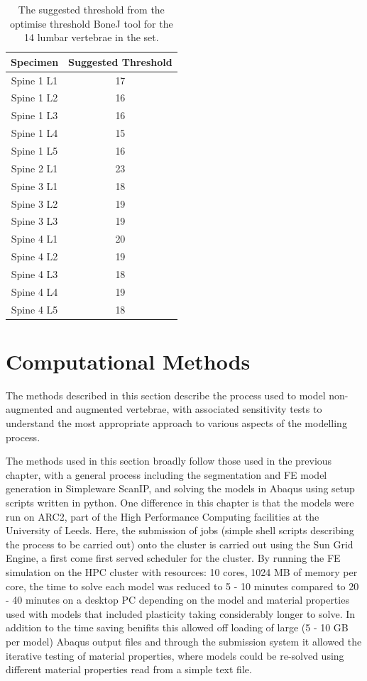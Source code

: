 \begin{table}[ht!]
	\caption{The suggested threshold from the optimise threshold BoneJ tool for
the 14 lumbar vertebrae in the set.}
	\label{tab:optTH}
	\centering
	\begin{tabular}{c|c}
    Specimen    & Suggested Threshold   \\ \hline \hline
    Spine 1 L1 & 17 \\
    Spine 1 L2 & 16\\
    Spine 1 L3 & 16\\
    Spine 1 L4 & 15\\
    Spine 1 L5 & 16\\
    Spine 2 L1 & 23\\
    Spine 3 L1 & 18\\
    Spine 3 L2 & 19\\
    Spine 3 L3 & 19\\
    Spine 4 L1 & 20\\
    Spine 4 L2 & 19\\
    Spine 4 L3 & 18\\
    Spine 4 L4 & 19\\
    Spine 4 L5 & 18\\
    \hline
	\end{tabular}
\end{table}



\section{Computational Methods}\label{sec:comp_mod}

The methods described in this section describe the process used to model
non-augmented and augmented vertebrae, with associated sensitivity tests to
understand the most appropriate approach to various aspects of the modelling
process.


The methods used in this section broadly follow those used in the previous
chapter, with a general process including the segmentation and FE model
generation in Simpleware ScanIP, and solving the models in Abaqus using setup
scripts written in python. One difference in this chapter is that the models
were run on ARC2, part of the High Performance Computing facilities at the
University of Leeds. Here, the submission of jobs (simple shell scripts
describing the process to be carried out) onto the cluster is carried out using
the Sun Grid
Engine, a first come first served scheduler for the cluster. By running the FE
simulation on the HPC cluster with resources: 10 cores, 1024 MB of memory per
core, the time to solve each model was reduced to 5 - 10 minutes compared to 20
- 40 minutes on a desktop PC depending on the model and material properties
used with models that included plasticity taking considerably longer to solve.
In addition to the time saving benifits this allowed off loading of large (5 -
10 GB per model) Abaqus output files and through the submission system it
allowed the iterative testing of material properties, where models could be
re-solved using different material properties read from a simple text file.

